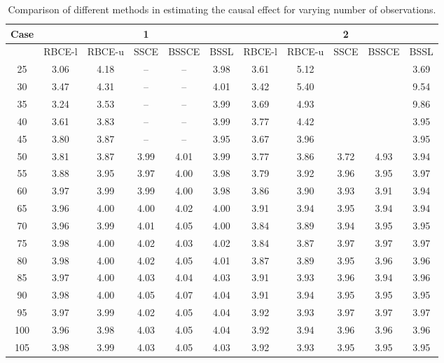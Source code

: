 \documentclass[preprint,12pt]{elsarticle}
\begin{document}
\begin{table}[ht]
\centering
\tiny
\caption{Comparison of different methods in estimating the causal effect for varying number of observations.}
\begin{tabular}{c|ccccc|ccccc}
  \hline
 Case&  &  & 1 &  &  &  &  & 2 &  &  \\ 
  \hline
 & RBCE-l & RBCE-u & SSCE & BSSCE & BSSL & RBCE-l & RBCE-u & SSCE & BSSCE & BSSL \\ 
  \hline
25 & 3.06 & 4.18 & -- & -- & 3.98 & 3.61 & 5.12 &  &  & 3.69 \\ 
  30 & 3.47 & 4.31 & -- & -- & 4.01 & 3.42 & 5.40 &  &  & 9.54 \\ 
  35 & 3.24 & 3.53 & -- & -- & 3.99 & 3.69 & 4.93 &  &  & 9.86 \\ 
  40 & 3.61 & 3.83 & -- & -- & 3.99 & 3.77 & 4.42 &  &  & 3.95 \\ 
  45 & 3.80 & 3.87 & -- & -- & 3.95 & 3.67 & 3.96 &  &  & 3.95 \\ 
  50 & 3.81 & 3.87 & 3.99 & 4.01 & 3.99 & 3.77 & 3.86 & 3.72 & 4.93 & 3.94 \\ 
  55 & 3.88 & 3.95 & 3.97 & 4.00 & 3.98 & 3.79 & 3.92 & 3.96 & 3.95 & 3.97 \\ 
  60 & 3.97 & 3.99 & 3.99 & 4.00 & 3.98 & 3.86 & 3.90 & 3.93 & 3.91 & 3.94 \\ 
  65 & 3.96 & 4.00 & 4.00 & 4.02 & 4.00 & 3.91 & 3.94 & 3.95 & 3.94 & 3.94 \\ 
  70 & 3.96 & 3.99 & 4.01 & 4.05 & 4.00 & 3.84 & 3.89 & 3.94 & 3.95 & 3.95 \\ 
  75 & 3.98 & 4.00 & 4.02 & 4.03 & 4.02 & 3.84 & 3.87 & 3.97 & 3.97 & 3.97 \\ 
  80 & 3.98 & 4.00 & 4.02 & 4.05 & 4.01 & 3.87 & 3.89 & 3.95 & 3.96 & 3.96 \\ 
  85 & 3.97 & 4.00 & 4.03 & 4.04 & 4.03 & 3.91 & 3.93 & 3.96 & 3.94 & 3.96 \\ 
  90 & 3.98 & 4.00 & 4.05 & 4.07 & 4.04 & 3.91 & 3.94 & 3.95 & 3.95 & 3.95 \\ 
  95 & 3.97 & 3.99 & 4.02 & 4.05 & 4.04 & 3.92 & 3.93 & 3.97 & 3.97 & 3.97 \\ 
  100 & 3.96 & 3.98 & 4.03 & 4.05 & 4.04 & 3.92 & 3.94 & 3.96 & 3.96 & 3.96 \\ 
  105 & 3.98 & 3.99 & 4.03 & 4.05 & 4.03 & 3.92 & 3.93 & 3.95 & 3.95 & 3.95 \\ 

\end{tabular}
\end{table}
\end{document}
